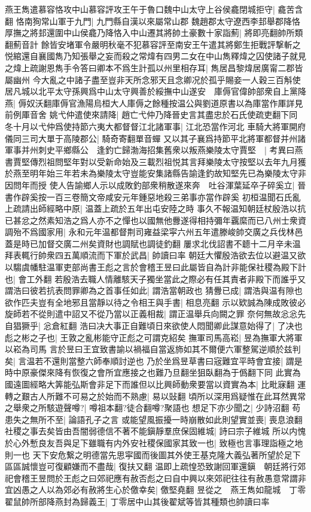 燕王雋遣慕容恪攻中山慕容評攻王午于魯口魏中山太守上谷侯龕閉城拒守|{
	龕苦含翻}
恪南狥常山軍于九門|{
	九門縣自漢以來屬常山郡}
魏趙郡太守遼西李邽舉郡降恪厚撫之將邽還圍中山侯龕乃降恪入中山遷其將帥土豪數十家詣薊|{
	將即亮翻帥所類翻薊音計}
餘皆安堵軍令嚴明秋毫不犯慕容評至南安王午遣其將鄭生拒戰評撃斬之悦綰還自襄國雋乃知張舉之妄而殺之常煒有四男二女在中山雋釋煒之囚使諸子就見之煒上疏謝恩雋手令答曰卿本不爲生計孤以州里相存耳|{
	雋居昌黎煒居廣甯二郡皆屬幽州}
今大亂之中諸子盡至豈非天所念邪天且念卿况於孤乎賜妾一人穀三百斛使居凡城以北平太守孫興爲中山太守興善於綏撫中山遂安　庫傉官偉帥部衆自上黨降燕|{
	傉奴沃翻庫傉官漁陽烏桓大人庫傉之餘種按温公與劉道原書以為庫當作厙詳見前例厙音舍}
姚弋仲遣使來請降|{
	趙亡弋仲乃降晉史言其盡忠於石氏使疏吏翻下同}
冬十月以弋仲爲使持節六夷大都督督江北諸軍事|{
	江北恐當作河北}
車騎大將軍開府儀同三司大單于高陵郡公|{
	騎奇寄翻單音蟬}
又以其子襄爲持節平北將軍都督并州諸軍事并州刺史平鄉縣公　逢釣亡歸渤海招集舊衆以叛燕樂陵太守賈堅　|{
	考異曰燕書賈堅傳烈祖問堅年對以受新命始及三載烈祖悦其言拜樂陵太守按堅以去年九月獲於燕至明年始三年若未為樂陵太守豈能安集諸縣告諭逢釣故知堅先已為樂陵太守非因問年而授}
使人告諭鄉人示以成敗釣部衆稍散遂來奔　吐谷渾葉延卒子碎奚立|{
	晉書作辟奚按一百三卷簡文帝咸安元年鍾惡地殺三弟事亦當作辟奚}
初桓温聞石氏亂上疏請出師經略中原|{
	温蓋上疏於五年出屯安陸之時}
事久不報温知朝廷杖殷浩以抗已甚忿之然素知浩之爲人亦不之憚也以國無他釁遂得相持彌年覊縻而已八州士衆資調殆不爲國家用|{
	永和元年温都督荆司雍益梁寜六州五年遣滕峻帥交廣之兵伐林邑蓋是時已加督交廣二州矣資財也調賦也調徒釣翻}
屢求北伐詔書不聼十二月辛未温拜表輒行帥衆四五萬順流而下軍於武昌|{
	帥讀曰率}
朝廷大懼殷浩欲去位以避温又欲以騶虞幡駐温軍吏部尚書王彪之言於會稽王昱曰此屬皆自為計非能保社稷為殿下計也|{
	會工外翻}
若殷浩去職人情離駭天子獨坐當此之際必有任其責者非殿下而誰乎又謂浩曰彼若抗表問罪卿為之首事任如此|{
	謂浩當朝政也}
猜釁已成|{
	謂浩與温有隙也}
欲作匹夫豈有全地邪且當靜以待之令相王與手書|{
	相息亮翻}
示以欵誠為陳成敗彼必旋師若不從則遣中詔又不從乃當以正義相裁|{
	謂正温舉兵向闕之罪}
奈何無故忩忩先自猖獗乎|{
	忩倉紅翻}
浩曰决大事正自難頃日來欲使人悶聞卿此謀意始得了|{
	了决也}
彪之彬之子也|{
	王敦之亂彬能守正彪之可謂克紹矣}
撫軍司馬高崧|{
	昱為撫軍大將軍以崧為司馬}
言於昱曰王宜致書諭以禍福自當返斾如其不爾便六軍整駕逆順於兹判矣|{
	言温若不還則當整六師奉順討逆也}
乃於坐爲昱草書曰宼難宜平時會宜接|{
	謂是時中原豪傑來降有恢復之會所宜應接之也難乃旦翻坐狙臥翻為于僞翻下同}
此實為國遠圖經略大筭能弘斯會非足下而誰但以比興師動衆要當以資實為本|{
	比毗寐翻}
運轉之艱古人所難不可易之於始而不熟慮|{
	易以䜴翻}
頃所以深用爲疑惟在此耳然異常之舉衆之所駭遊聲噂?|{
	噂祖本翻?徒合翻噂?聚語也}
想足下亦少聞之|{
	少詩沼翻}
苟患失之無所不至|{
	論語孔子之言}
或能望風振擾一時崩散如此則望實並喪|{
	喪息浪翻}
社稷之事去矣皆由吾闇弱德信不著不能鎭靜羣庶保固維城|{
	詩曰宗子維城}
所以内愧於心外慙良友吾與足下雖職有内外安社稷保國家其致一也|{
	致極也言事理詣極之地則一也}
天下安危繋之明德當先思寜國而後圖其外使王基克隆大義弘著所望於足下區區誠懷豈可復顧嫌而不盡哉|{
	復扶又翻}
温即上疏惶恐致謝回軍還鎭　朝廷將行郊祀會稽王昱問於王彪之曰郊祀應有赦否彪之曰自中興以來郊祀往往有赦愚意常謂非宜凶愚之人以為郊必有赦將生心於儌幸矣|{
	儌堅堯翻}
昱從之　燕王雋如龍城　丁零翟鼠帥所部降燕封為歸義王|{
	丁零居中山其後翟斌等皆其種類也帥讀曰率}



